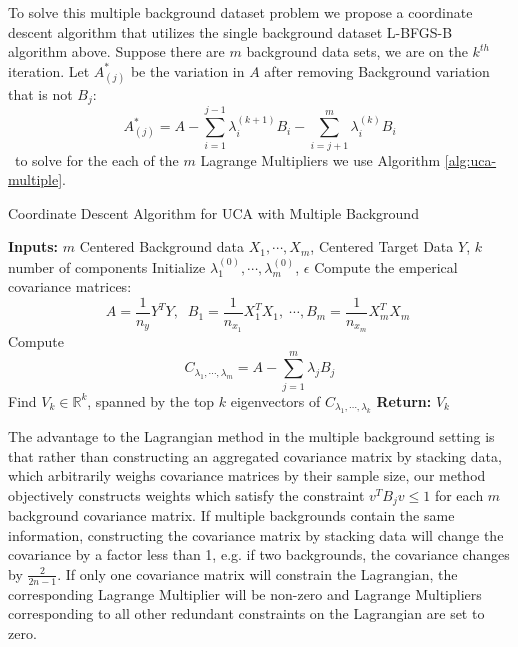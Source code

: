 \documentclass[12pt]{article}
\begin{document}
To solve this multiple background dataset problem we propose a coordinate descent algorithm that utilizes the single background dataset L-BFGS-B  \cite{byrd1995limited} algorithm above.
Suppose there are $m$ background data sets, we are on the $k^{th}$ iteration. Let $A_{(j)}^*$ be the variation in $A$ after removing Background variation that is not $B_j$:
     \[A_{(j)}^{*} = A - \sum_{ i = 1 }^{j-1}\lambda_{i}^{(k+1)}B_i - \sum_{i =j+1}^{m}\lambda_{i}^{(k)}B_i \] \
to solve for the each of the $m$ Lagrange Multipliers we use Algorithm \ref{alg:uca-multiple}.

\begin{algorithm}[ht]
\label{alg:uca-multiple}
\caption{Coordinate Descent Algorithm for UCA with Multiple Background}
\textbf{Inputs: } $m$ Centered Background data $X_1,\cdots, X_m $, Centered Target Data $Y$, $k$ number of components\;
    Initialize $\lambda_{1}^{(0)}, \cdots,\lambda_{m}^{(0)} $, $\epsilon$\;
  Compute the emperical covariance matrices:
  \[A = \frac{1}{n_y}Y^TY,\;\; B_1 = \frac{1}{n_{x_1}}X_1^TX_1,\;\cdots, B_m = \frac{1}{n_{x_m}}X_m^TX_m\; \]
  Compute \[C_{\lambda_1, \cdots, \lambda_m} = A - \sum^{m}_{j = 1}{\lambda_j B_j}\]
  Find $V_k\in \mathbb{R}^k$, spanned by the top $k$ eigenvectors of $C_{\lambda_1, \cdots, \lambda_k}$\;
\textbf{Return: } $V_k$
\end{algorithm}


The advantage to the Lagrangian method in the multiple background setting is that rather than constructing an aggregated covariance matrix by stacking data, which arbitrarily weighs covariance matrices by their sample size, our method objectively constructs weights which satisfy the constraint $ v^TB_jv\leq 1$ for each $m$ background covariance matrix. If multiple backgrounds contain the same information, constructing the covariance matrix by stacking data will change the covariance by a factor less than 1, e.g. if two backgrounds, the covariance changes by $\frac{2}{2n - 1}$.  If only one covariance matrix will constrain the Lagrangian, the corresponding Lagrange Multiplier will be non-zero and Lagrange Multipliers corresponding to all other redundant constraints on the Lagrangian are set to zero.  
\end{document}
